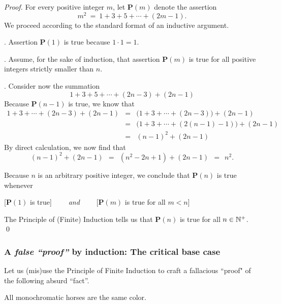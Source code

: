\begin{proof}
For every positive integer $m$, let {\bf P}$(m)$ denote the assertion
\[ m^2 \ = \ 1 + 3 + 5 + \cdots + (2m-1). \]
We proceed according to the standard format of an inductive argument.

\smallskip

.
Assertion {\bf P}$(1)$ is true because $1 \cdot 1 = 1$.

\smallskip

.
Assume, for the sake of induction, that assertion {\bf P}$(m)$ is true for all positive integers strictly smaller than $n$.

\smallskip

.
Consider now the summation
\[ 1 + 3 + 5 + \cdots + (2n-3) + (2n-1) \]
Because {\bf P}$(n-1)$ is true, we know that
\begin{eqnarray*}
1 + 3 + \cdots + (2n-3) + (2n-1)
  & = & 
\big(1 + 3 + \cdots + (2n-3) \big) + (2n-1) \\
  & = &
\big(1 + 3 + \cdots + (2(n-1) -1) \big) + (2n-1) \\
  & = & (n-1)^2 + (2n-1)
\end{eqnarray*}
By direct calculation, we now find that
\[ (n-1)^2 + (2n-1) \ \ = \ \ (n^2 -2n +1) + (2n-1) \ \ = \ \ n^2. \]

\smallskip

\noindent
Because $n$ is an arbitrary positive integer, we conclude that {\bf P}$(n)$ is true whenever

\hspace*{.35in}[{\bf P}$(1)$ is true] \ \ \ \ {\em and} \ \ \ \
[{\bf P}$(m)$ is true for all $m < n$]

\noindent
The Principle of (Finite) Induction tells us that {\bf P}$(n)$ is true for all $n \in \mathbb{N}^+$.  \qed
\end{proof}

\subsubsection{A {\em false ``proof''} by induction: The critical base case}
\label{sec:false-induction}

Let us (mis)use the Principle of Finite Induction to craft a fallacious ``proof" of the following absurd ``fact''.

\medskip

All monochromatic horses are the same color.

